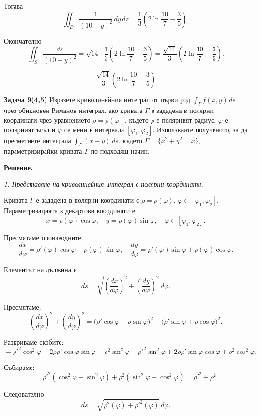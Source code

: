 \documentclass[10pt]{article}
\begin{document}
Тогава
\[
\iint_D \frac{1}{(10-y)^2} \, dy\,dz = \frac{1}{3} \left( 2\ln\frac{10}{7} - \frac{3}{5} \right).
\]

Окончателно
\[
\iint_S \frac{ds}{(10-y)^2} = \sqrt{14} \cdot \frac{1}{3} \left( 2\ln\frac{10}{7} - \frac{3}{5} \right) = \frac{\sqrt{14}}{3} \left( 2\ln\frac{10}{7} - \frac{3}{5} \right).
\]

\[
\boxed{\frac{\sqrt{14}}{3} \left( 2\ln\frac{10}{7} - \frac{3}{5} \right)}
\]


\textbf{Задача 9(4,5) }Изразете криволинейния интеграл от първи род $\int_\Gamma f(x,y)\,ds$ чрез обикновен Риманов интеграл, ако кривата $\Gamma$ е зададена в полярни координати чрез уравнението $\rho = \rho(\varphi)$, където $\rho$ е полярният радиус, $\varphi$ е полярният ъгъл и $\varphi$ се мени в интервала $[\varphi_1,\varphi_2]$. Използвайте полученото, за да пресметнете интеграла $\int_\Gamma (x-y)\,ds$, където $\Gamma = \{x^2+y^2=x\}$, параметризирайки кривата $\Gamma$ по подходящ начин.

\textbf{Решение.} 

\textit{1. Представяне на криволинейния интеграл в полярни координати.}

Кривата $\Gamma$ е зададена в полярни координати с $\rho = \rho(\varphi)$, $\varphi \in [\varphi_1,\varphi_2]$. Параметризацията в декартови координати е
\[
x = \rho(\varphi)\cos\varphi, \quad y = \rho(\varphi)\sin\varphi, \quad \varphi \in [\varphi_1,\varphi_2].
\]

Пресмятаме производните:
\[
\frac{dx}{d\varphi} = \rho'(\varphi)\cos\varphi - \rho(\varphi)\sin\varphi, \quad
\frac{dy}{d\varphi} = \rho'(\varphi)\sin\varphi + \rho(\varphi)\cos\varphi.
\]

Елементът на дължина е
\[
ds = \sqrt{\left(\frac{dx}{d\varphi}\right)^2 + \left(\frac{dy}{d\varphi}\right)^2} \, d\varphi.
\]

Пресмятаме:
\[
\left(\frac{dx}{d\varphi}\right)^2 + \left(\frac{dy}{d\varphi}\right)^2 = \bigl(\rho'\cos\varphi - \rho\sin\varphi\bigr)^2 + \bigl(\rho'\sin\varphi + \rho\cos\varphi\bigr)^2.
\]

Разкриваме скобите:
\[
= \rho'^2\cos^2\varphi - 2\rho\rho'\cos\varphi\sin\varphi + \rho^2\sin^2\varphi + \rho'^2\sin^2\varphi + 2\rho\rho'\sin\varphi\cos\varphi + \rho^2\cos^2\varphi.
\]

Събираме:
\[
= \rho'^2(\cos^2\varphi+\sin^2\varphi) + \rho^2(\sin^2\varphi+\cos^2\varphi) = \rho'^2 + \rho^2.
\]

Следователно
\[
ds = \sqrt{\rho^2(\varphi) + \rho'^2(\varphi)} \, d\varphi.
\]
\end{document}
